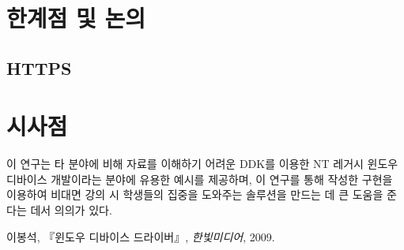 \documentclass{tudelftposter}
\begin{document}
\section{한계점 및 논의}
\subsection{HTTPS}


\section{시사점}
이 연구는 타 분야에 비해 자료를 이해하기 어려운 DDK를 이용한 NT 레거시 윈도우 디바이스 개발이라는 분야에 유용한 예시를 제공하며, 이 연구를 통해 작성한 구현을 이용하여 비대면 강의 시 학생들의 집중을 도와주는 솔루션을 만드는 데 큰 도움을 준다는 데서 의의가 있다.

\begin{thebibliography}{1}
    이봉석, 『윈도우 디바이스 드라이버』, {\em 한빛미디어}, 2009.
\end{thebibliography}
\end{document}
